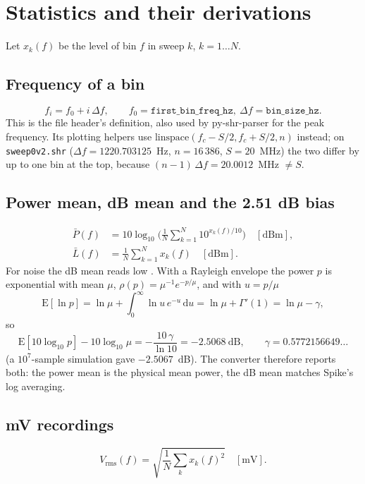 \documentclass[11pt,a4paper]{article}
\newcommand{\code}[1]{\texttt{#1}}
\begin{document}
\section{Statistics and their derivations}
Let $x_k(f)$ be the level of bin $f$ in sweep $k$, $k=1\ldots N$.
\subsection{Frequency of a bin}
\begin{equation}f_i = f_0 + i\,\Delta f,\qquad f_0=\code{first\_bin\_freq\_hz},\ \Delta f=\code{bin\_size\_hz}.\end{equation}
This is the file header's definition, also used by py-shr-parser for the peak frequency. Its plotting helpers
use $\mathrm{linspace}(f_c-S/2, f_c+S/2, n)$ instead; on \code{sweep0v2.shr}
($\Delta f = 1220.703125$~Hz, $n=16\,386$, $S=20$~MHz) the two differ by up to one bin at the top, because
$(n-1)\,\Delta f = 20.0012$~MHz $\neq S$.
\subsection{Power mean, dB mean and the 2.51 dB bias}
\begin{align}
\bar P(f) &= 10\log_{10}\!\Big(\frac1N\sum_{k=1}^{N}10^{x_k(f)/10}\Big)\quad[\mathrm{dBm}],\\
\bar L(f) &= \frac1N\sum_{k=1}^{N}x_k(f)\quad[\mathrm{dBm}].
\end{align}
For noise the dB mean reads low \cite{r4}. With a Rayleigh envelope the power $p$ is exponential with mean
$\mu$, $\rho(p)=\mu^{-1}e^{-p/\mu}$, and with $u=p/\mu$
\begin{equation}
\mathrm{E}[\ln p]=\ln\mu+\int_0^\infty \ln u\,e^{-u}\,\mathrm du=\ln\mu+\Gamma'(1)=\ln\mu-\gamma,
\end{equation}
so
\begin{equation}
\mathrm{E}[10\log_{10}p]-10\log_{10}\mu=-\frac{10\,\gamma}{\ln 10}=-2.5068~\mathrm{dB},
\qquad \gamma=0.5772156649\ldots
\end{equation}
(a $10^7$-sample simulation gave $-2.5067$~dB). The converter therefore reports both: the power mean is the
physical mean power, the dB mean matches Spike's log averaging.
\subsection{mV recordings}
\begin{equation}V_\mathrm{rms}(f)=\sqrt{\frac1N\sum_k x_k(f)^2}\quad[\mathrm{mV}].\end{equation}
\end{document}
